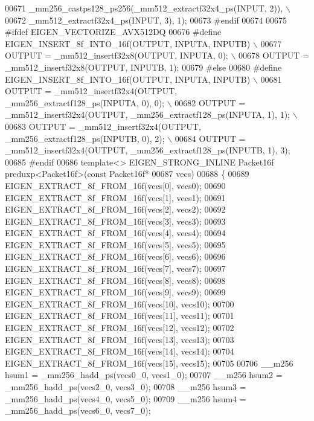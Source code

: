 \begin{DoxyCode}
00671 \textcolor{preprocessor}{      \_mm256\_castps128\_ps256(\_mm512\_extractf32x4\_ps(INPUT, 2)), \(\backslash\)}
00672 \textcolor{preprocessor}{      \_mm512\_extractf32x4\_ps(INPUT, 3), 1);}
00673 \textcolor{preprocessor}{#endif}
00674 
00675 \textcolor{preprocessor}{#ifdef EIGEN\_VECTORIZE\_AVX512DQ}
00676 \textcolor{preprocessor}{#define EIGEN\_INSERT\_8f\_INTO\_16f(OUTPUT, INPUTA, INPUTB) \(\backslash\)}
00677 \textcolor{preprocessor}{  OUTPUT = \_mm512\_insertf32x8(OUTPUT, INPUTA, 0);        \(\backslash\)}
00678 \textcolor{preprocessor}{  OUTPUT = \_mm512\_insertf32x8(OUTPUT, INPUTB, 1);}
00679 \textcolor{preprocessor}{#else}
00680 \textcolor{preprocessor}{#define EIGEN\_INSERT\_8f\_INTO\_16f(OUTPUT, INPUTA, INPUTB)                    \(\backslash\)}
00681 \textcolor{preprocessor}{  OUTPUT = \_mm512\_insertf32x4(OUTPUT, \_mm256\_extractf128\_ps(INPUTA, 0), 0); \(\backslash\)}
00682 \textcolor{preprocessor}{  OUTPUT = \_mm512\_insertf32x4(OUTPUT, \_mm256\_extractf128\_ps(INPUTA, 1), 1); \(\backslash\)}
00683 \textcolor{preprocessor}{  OUTPUT = \_mm512\_insertf32x4(OUTPUT, \_mm256\_extractf128\_ps(INPUTB, 0), 2); \(\backslash\)}
00684 \textcolor{preprocessor}{  OUTPUT = \_mm512\_insertf32x4(OUTPUT, \_mm256\_extractf128\_ps(INPUTB, 1), 3);}
00685 \textcolor{preprocessor}{#endif}
00686 \textcolor{keyword}{template}<> EIGEN\_STRONG\_INLINE Packet16f preduxp<Packet16f>(\textcolor{keyword}{const} Packet16f*
00687 vecs)
00688 \{
00689   EIGEN\_EXTRACT\_8f\_FROM\_16f(vecs[0], vecs0);
00690   EIGEN\_EXTRACT\_8f\_FROM\_16f(vecs[1], vecs1);
00691   EIGEN\_EXTRACT\_8f\_FROM\_16f(vecs[2], vecs2);
00692   EIGEN\_EXTRACT\_8f\_FROM\_16f(vecs[3], vecs3);
00693   EIGEN\_EXTRACT\_8f\_FROM\_16f(vecs[4], vecs4);
00694   EIGEN\_EXTRACT\_8f\_FROM\_16f(vecs[5], vecs5);
00695   EIGEN\_EXTRACT\_8f\_FROM\_16f(vecs[6], vecs6);
00696   EIGEN\_EXTRACT\_8f\_FROM\_16f(vecs[7], vecs7);
00697   EIGEN\_EXTRACT\_8f\_FROM\_16f(vecs[8], vecs8);
00698   EIGEN\_EXTRACT\_8f\_FROM\_16f(vecs[9], vecs9);
00699   EIGEN\_EXTRACT\_8f\_FROM\_16f(vecs[10], vecs10);
00700   EIGEN\_EXTRACT\_8f\_FROM\_16f(vecs[11], vecs11);
00701   EIGEN\_EXTRACT\_8f\_FROM\_16f(vecs[12], vecs12);
00702   EIGEN\_EXTRACT\_8f\_FROM\_16f(vecs[13], vecs13);
00703   EIGEN\_EXTRACT\_8f\_FROM\_16f(vecs[14], vecs14);
00704   EIGEN\_EXTRACT\_8f\_FROM\_16f(vecs[15], vecs15);
00705 
00706   \_\_m256 hsum1 = \_mm256\_hadd\_ps(vecs0\_0, vecs1\_0);
00707   \_\_m256 hsum2 = \_mm256\_hadd\_ps(vecs2\_0, vecs3\_0);
00708   \_\_m256 hsum3 = \_mm256\_hadd\_ps(vecs4\_0, vecs5\_0);
00709   \_\_m256 hsum4 = \_mm256\_hadd\_ps(vecs6\_0, vecs7\_0);

\end{DoxyCode}
